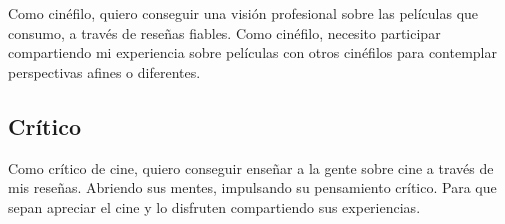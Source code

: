 Como cinéfilo, quiero conseguir una visión profesional sobre las películas que consumo, a través de reseñas fiables. Como cinéfilo, necesito participar compartiendo mi experiencia sobre películas con otros cinéfilos para contemplar perspectivas afines o diferentes. 

\subsection{Crítico}

Como crítico de cine, quiero conseguir enseñar a la gente sobre cine a través de mis reseñas. Abriendo sus mentes, impulsando su pensamiento crítico. Para que sepan apreciar el cine y lo disfruten compartiendo sus experiencias.

